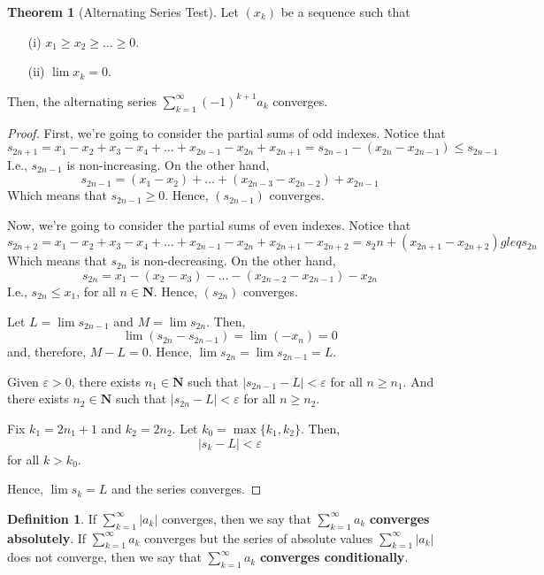 \documentclass[12pt,a4paper]{article}
\theoremstyle{definition}
\newtheorem{theorem}{Theorem}[section]
\newtheorem{definition}{Definition}[section]
\begin{document}
\begin{theorem}[Alternating Series Test]
	Let $(x_k)$ be a sequence such that
	\begin{enumerate}
		\item[(i)] $x_1 \geq x_2 \geq \ldots \geq 0$.
		\item[(ii)] $\lim x_k = 0$.
	\end{enumerate}
	Then, the alternating series $\sum_{k=1}^\infty (-1)^{k+1} a_k$ converges.
\end{theorem}

\begin{proof}
	First, we're going to consider the partial sums of odd indexes. Notice that
	\[
		s_{2n+1} = x_1 - x_2 + x_3 - x_4 + \ldots + x_{2n-1} - x_{2n} + x_{2n+1} = s_{2n-1} - (x_{2n} - x_{2n-1}) \leq s_{2n-1}
	\]
	I.e., $s_{2n-1}$ is non-increasing. On the other hand,
	\[
		s_{2n-1} = (x_1 - x_2) + \ldots + (x_{2n-3} - x_{2n-2}) + x_{2n-1}
	\]
	Which means that $s_{2n-1} \geq 0$. Hence, $(s_{2n-1})$ converges.
	
	Now, we're going to consider the partial sums of even indexes. Notice that
	\[
		s_{2n+2} = x_1 - x_2 + x_3 - x_4 + \ldots + x_{2n-1} - x_{2n} + x_{2n+1} - x_{2n+2} = s_2n + (x_{2n+1} - x_{2n+2}) gleq s_{2n}
	\]
	Which means that $s_{2n}$ is non-decreasing. On the other hand,
	\[
		s_{2n} = x_1 - (x_2 - x_3) - \ldots - (x_{2n-2} - x_{2n-1}) - x_{2n}
	\]
	I.e., $s_{2n} \leq x_1$, for all $n \in \textbf{N}$. Hence, $(s_{2n})$ converges.
	
	Let $L = \lim s_{2n-1}$ and $M = \lim s_{2n}$. Then,
	\[
		\lim (s_{2n} - s_{2n-1}) = \lim (-x_n) = 0
	\]
	and, therefore, $M - L = 0$. Hence, $\lim s_{2n} = \lim s_{2n-1} = L$.
	
	Given $\varepsilon > 0$, there exists $n_1 \in \textbf{N}$ such that $|s_{2n-1} - L| < \varepsilon$ for all $n \geq n_1$. And there exists $n_2 \in \textbf{N}$ such that $|s_{2n} - L| < \varepsilon$ for all $n \geq n_2$.
	
	Fix $k_1 = 2n_1 +1$ and $k_2 = 2n_2$. Let $k_0 = \max \{ k_1, k_2 \}$. Then,
	\[
		|s_k - L| < \varepsilon
	\]
	for all $k > k_0$.
	
	Hence, $\lim s_k = L$ and the series converges.
\end{proof}

\begin{definition}
	If $\sum_{k=1}^\infty |a_k|$ converges, then we say that $\sum_{k=1}^\infty a_k$ \textbf{converges absolutely}. If $\sum_{k=1}^\infty a_k$ converges but the series of absolute values $\sum_{k=1}^\infty |a_k|$ does not converge, then we say that $\sum_{k=1}^\infty a_k$ \textbf{converges conditionally}.
\end{definition}
\end{document}
